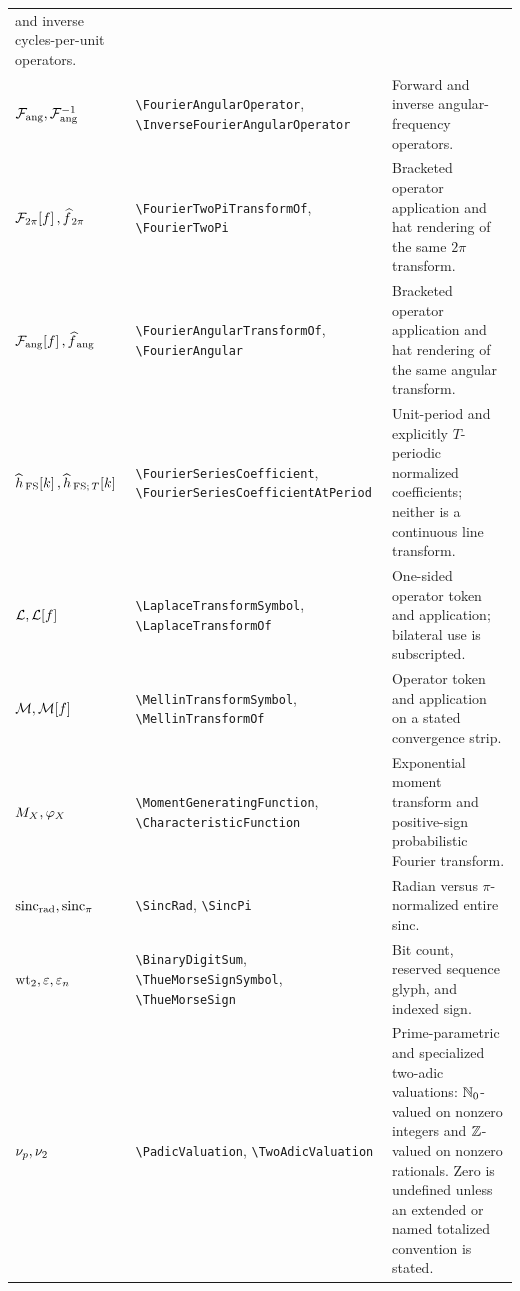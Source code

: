 \documentclass[11pt,oneside]{article}
\theoremstyle{definition}
\theoremstyle{remark}
\DeclareRobustCommand{\commandname}[1]{\texttt{\textbackslash#1}}
\begin{document}
\begin{longtable}{@{}L{0.22\textwidth}S{0.38\textwidth}L{0.34\textwidth}@{}}
and inverse cycles-per-unit operators.\\
$\FourierAngularOperator,\InverseFourierAngularOperator$ &
\commandname{FourierAngularOperator}, \commandname{InverseFourierAngularOperator} &
Forward and inverse angular-frequency operators.\\
$\FourierTwoPiTransformOf{f},\FourierTwoPi{f}$ &
\commandname{FourierTwoPiTransformOf}, \commandname{FourierTwoPi} & Bracketed operator
application and hat rendering of the same $2\pi$ transform.\\
$\FourierAngularTransformOf{f},\FourierAngular{f}$ &
\commandname{FourierAngularTransformOf}, \commandname{FourierAngular} & Bracketed
operator application and hat rendering of the same angular transform.\\
$\FourierSeriesCoefficient{h}{k},\FourierSeriesCoefficientAtPeriod{h}{k}{T}$ &
\commandname{FourierSeriesCoefficient},
\commandname{FourierSeriesCoefficientAtPeriod} & Unit-period and explicitly
$T$-periodic normalized coefficients; neither is a continuous line transform.\\
$\LaplaceTransformSymbol,\LaplaceTransformOf{f}$ &
\commandname{LaplaceTransformSymbol}, \commandname{LaplaceTransformOf} & One-sided
operator token and application; bilateral use is subscripted.\\
$\MellinTransformSymbol,\MellinTransformOf{f}$ &
\commandname{MellinTransformSymbol}, \commandname{MellinTransformOf} & Operator token and
application on a stated convergence strip.\\
$\MomentGeneratingFunction{X},\CharacteristicFunction{X}$ &
\commandname{MomentGeneratingFunction}, \commandname{CharacteristicFunction} &
Exponential moment transform and positive-sign probabilistic Fourier transform.\\
$\SincRad,\SincPi$ & \commandname{SincRad}, \commandname{SincPi} & Radian versus
$\pi$-normalized entire sinc.\\
$\BinaryDigitSum,\ThueMorseSignSymbol,\ThueMorseSign{n}$ &
\commandname{BinaryDigitSum}, \commandname{ThueMorseSignSymbol},
\commandname{ThueMorseSign} & Bit count, reserved sequence glyph, and indexed sign.\\
$\PadicValuation{p},\TwoAdicValuation$ & \commandname{PadicValuation},
\commandname{TwoAdicValuation} & Prime-parametric and specialized two-adic valuations:
$\NaturalNumbers$-valued on nonzero integers and $\IntegerNumbers$-valued on nonzero
rationals.  Zero is undefined unless an extended or named totalized convention is stated.\\

\end{longtable}
\end{document}

